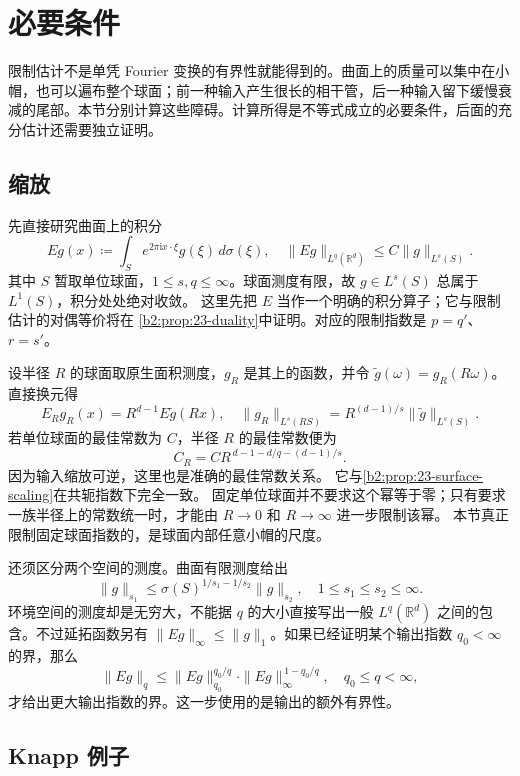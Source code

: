 \section{必要条件}
\label{b2:sec:2302}

限制估计不是单凭 Fourier 变换的有界性就能得到的。曲面上的质量可以集中在小帽，也可以遍布整个球面；前一种输入产生很长的相干管，后一种输入留下缓慢衰减的尾部。本节分别计算这些障碍。计算所得是不等式成立的必要条件，后面的充分估计还需要独立证明。

\subsection{缩放}
\label{b2:subsec:230201}

先直接研究曲面上的积分
\[
 Eg(x)\coloneqq\int_S e^{2\pi\mathrm i x\cdot\xi}
                     g(\xi)\,d\sigma(\xi),
 \quad \|Eg\|_{L^q(\mathbb R^d)}
                 \leq C\|g\|_{L^s(S)}.
\]
其中 \(S\) 暂取单位球面，\(1\leq s,q\leq\infty\)。球面测度有限，故
\(g\in L^s(S)\) 总属于 \(L^1(S)\)，积分处处绝对收敛。
这里先把 \(E\) 当作一个明确的积分算子；它与限制估计的对偶等价将在
\cref{b2:prop:23-duality}中证明。对应的限制指数是
\(p=q'\)、\(r=s'\)。

\ProseParagraphBreak
设半径 \(R\) 的球面取原生面积测度，\(g_R\) 是其上的函数，并令
\(\widetilde g(\omega)=g_R(R\omega)\)。直接换元得
\[
 E_Rg_R(x)=R^{d-1}E\widetilde g(Rx),\quad
 \|g_R\|_{L^s(RS)}
       =R^{(d-1)/s}\|\widetilde g\|_{L^s(S)}.
\]
若单位球面的最佳常数为 \(C\)，半径 \(R\) 的最佳常数便为
\[
 C_R=C R^{\,d-1-d/q-(d-1)/s}.
\]
因为输入缩放可逆，这里也是准确的最佳常数关系。
它与\cref{b2:prop:23-surface-scaling}在共轭指数下完全一致。
固定单位球面并不要求这个幂等于零；只有要求一族半径上的常数统一时，才能由 \(R\to0\) 和 \(R\to\infty\) 进一步限制该幂。
本节真正限制固定球面指数的，是球面内部任意小帽的尺度。

\ProseParagraphBreak
还须区分两个空间的测度。曲面有限测度给出
\[
 \|g\|_{s_1}\leq \sigma(S)^{1/s_1-1/s_2}\|g\|_{s_2},
 \quad 1\leq s_1\leq s_2\leq\infty.
\]
环境空间的测度却是无穷大，不能据 \(q\) 的大小直接写出一般
\(L^q(\mathbb R^d)\) 之间的包含。不过延拓函数另有
\(\|Eg\|_\infty\leq\|g\|_1\)。如果已经证明某个输出指数 \(q_0<\infty\)
的界，那么
\[
 \|Eg\|_q\leq
 \|Eg\|_{q_0}^{q_0/q}
       \cdot\|Eg\|_\infty^{\,1-q_0/q},
 \quad q_0\leq q<\infty,
\]
才给出更大输出指数的界。这一步使用的是输出的额外有界性。

\subsection{Knapp 例子}
\label{b2:subsec:230202}

